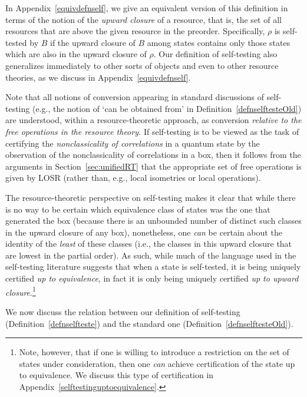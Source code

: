 \documentclass[12pt]{article}
\theoremstyle{plain}
\theoremstyle{definition}
\begin{document}
In Appendix~\ref{equivdefnself}, we give an equivalent version of this definition in terms of the notion of the \emph{upward closure} of a resource, that is, the set of all resources that are above the given resource in the preorder. Specifically, $\rho$ is self-tested by $B$ if the upward closure of $B$ among states contains only those states which are also in the upward closure of $\rho$. 
Our definition of self-testing also generalizes immediately to other sorts of objects and even to other resource theories, as we discuss in Appendix~\ref{equivdefnself}.


Note that all notions of conversion appearing in standard discussions of self-testing (e.g., the notion of `can be obtained from' in Definition~\ref{defnselftesteOld})
 are understood, within a resource-theoretic approach, as conversion {\em relative to the free operations in the resource theory.}
If self-testing is to be viewed as the task of certifying the {\em nonclassicality of correlations} in a quantum state by the observation of the nonclassicality of correlations in a box,
 then it follows from the arguments in Section~\ref{sec:unifiedRT} that the appropriate set of free operations is given by LOSR (rather than, e.g., local isometries or local operations).

The resource-theoretic perspective on self-testing makes it clear that while there is no way to be certain which equivalence class of states was the one that generated the box (because there is an unbounded number of distinct such classes in the upward closure of any box), nonetheless, one {\em can} be certain about the identity of the {\em least} of these classes (i.e., the classes in this upward closure that are lowest in the partial order). 
 As such, while much of the language used in the self-testing literature suggests that when a state is self-tested, it is being uniquely certified 
  {\em up to equivalence}, in fact it is only being uniquely certified 
  {\em up to upward closure}.\footnote{Note, however, that if one is willing to introduce a restriction on the set of states under consideration, then one {\em can} achieve certification of the state up to equivalence.  We discuss this type of certification in Appendix~\ref{selftestinguptoequivalence}.} 

  
We now discuss the relation between our definition of self-testing (Definition~\ref{defnselfteste}) and the standard one (Definition~\ref{defnselftesteOld}).
\end{document}
